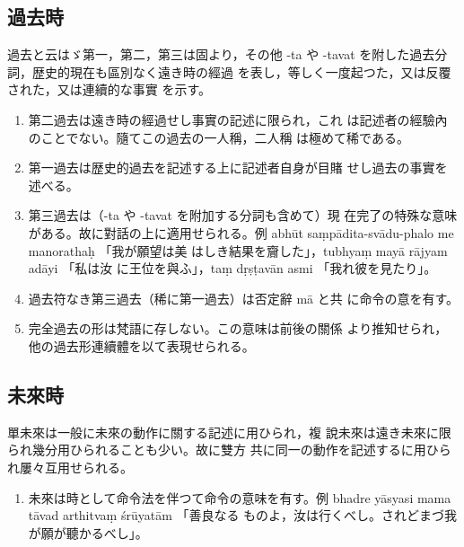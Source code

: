 \subsection{過去時}
\numberParagraph
過去と云はゞ第一，第二，第三は固より，その他 -ta や
-tavat を附した過去分詞，歴史的現在も區別なく遠き時の經過
を表し，等しく一度起つた，又は反覆された，又は連續的な事實
を示す。
\begin{enumerate}[label=(\alph*)]
\item 第二過去は遠き時の經過せし事實の記述に限られ，これ
は記述者の經驗內のことでない。隨てこの過去の一人稱，二人稱
は極めて稀である。
\item 第一過去は歴史的過去を記述する上に記述者自身が目賭
せし過去の事實を述べる。
\item 第三過去は（-ta や -tavat を附加する分詞も含めて）現
在完了の特殊な意味がある。故に對話の上に適用せられる。例
abhūt saṃpādita-svādu-phalo me manorathaḥ 「我が願望は美
はしき結果を齎した」，tubhyaṃ mayā rājyam adāyi 「私は汝
に王位を與ふ」，taṃ dṛṣṭavān asmi 「我れ彼を見たり」。
\item 過去符なき第三過去（稀に第一過去）は否定辭 mā と共
に命令の意を有す。
\item 完全過去の形は梵語に存しない。この意味は前後の關係
より推知せられ，他の過去形連續體を以て表現せられる。
\end{enumerate}

\subsection{未來時}
\numberParagraph
單未來は一般に未來の動作に關する記述に用ひられ，複
說未來は遠き未來に限られ幾分用ひられることも少い。故に雙方
共に同一の動作を記述するに用ひられ屢々互用せられる。
\begin{enumerate}[label=(\alph*)]
\item 未來は時として命令法を伴つて命令の意味を有す。例
bhadre yāsyasi mama tāvad arthitvaṃ śrūyatām 「善良なる
ものよ，汝は行くべし。されどまづ我が願が聽かるべし」。
\end{enumerate}

